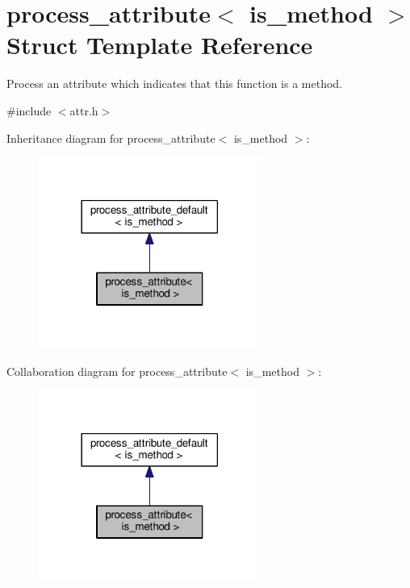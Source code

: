 \hypertarget{structprocess__attribute_3_01is__method_01_4}{}\section{process\+\_\+attribute$<$ is\+\_\+method $>$ Struct Template Reference}
\label{structprocess__attribute_3_01is__method_01_4}


Process an attribute which indicates that this function is a method.  




{\ttfamily \#include $<$attr.\+h$>$}



Inheritance diagram for process\+\_\+attribute$<$ is\+\_\+method $>$\+:
\nopagebreak
\begin{figure}[H]
\begin{center}
\leavevmode
\includegraphics[width=206pt]{structprocess__attribute_3_01is__method_01_4__inherit__graph}
\end{center}
\end{figure}


Collaboration diagram for process\+\_\+attribute$<$ is\+\_\+method $>$\+:
\nopagebreak
\begin{figure}[H]
\begin{center}
\leavevmode
\includegraphics[width=206pt]{structprocess__attribute_3_01is__method_01_4__coll__graph}
\end{center}
\end{figure}

